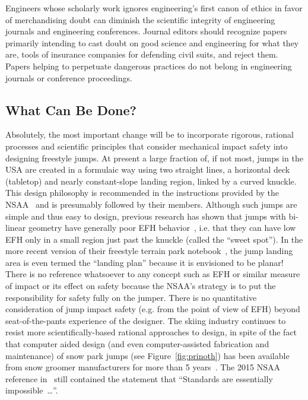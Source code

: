 \documentclass[smallextended]{svjour3}       %
\begin{document}
Engineers whose scholarly work ignores engineering's first canon of ethics in
favor of merchandising doubt can diminish the scientific integrity of
engineering journals and engineering conferences. Journal editors should
recognize papers primarily intending to cast doubt on good science and
engineering for what they are, tools of insurance companies for defending civil
suits, and reject them. Papers helping to perpetuate dangerous practices do not
belong in engineering journals or conference proceedings.

\subsection{What Can Be Done?}
\label{sec:action}
%
Absolutely, the most important change will be to incorporate rigorous, rational
processes and scientific principles that consider mechanical impact safety into
designing freestyle jumps.  At present a large fraction of, if not most, jumps
in the USA are created in a formulaic way using two straight lines, a
horizontal deck (tabletop) and nearly constant-slope landing region, linked by
a curved knuckle. This design philosophy is recommended in the instructions
provided by the NSAA~\cite{NSAA2015} and is presumably followed by their
members. Although such jumps are simple and thus easy to design, previous
research has shown that jumps with bi-linear geometry have generally poor EFH
behavior~\cite{Swedberg2012}, i.e. that they can have low EFH only in a small
region just past the knuckle (called the ``sweet spot''). In the more recent
version of their freestyle terrain park notebook~\cite{NSAA2015}, the jump
landing area is even termed the ``landing plan'' because it is envisioned to be
planar! There is no reference whatsoever to any concept such as EFH or similar
measure of impact or its effect on safety because the NSAA's strategy is to put
the responsibility for safety fully on the jumper. There is no quantitative
consideration of jump impact safety (e.g. from the point of view of EFH) beyond
seat-of-the-pants experience of the designer. The skiing industry continues to
resist more scientifically-based rational approaches to design, in spite of the
fact that computer aided design (and even computer-assisted fabrication and
maintenance) of snow park jumps (see Figure~\ref{fig:prinoth}) has been
available from snow groomer manufacturers for more than 5
years~\cite{Muigg2019}. The 2015 NSAA reference in~\cite{NSAA2015} still
contained the statement that ``Standards are essentially impossible~\ldots''.
%
\end{document}
